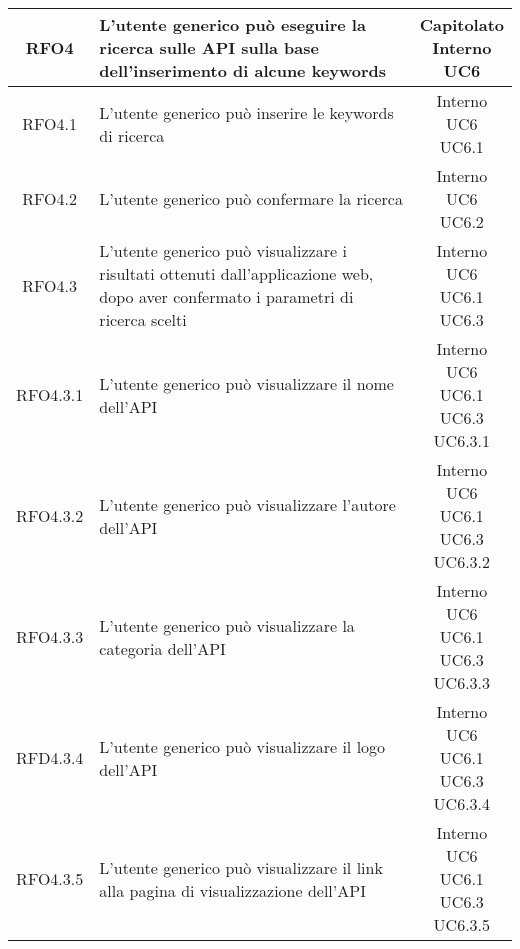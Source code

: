 \begin{longtable}{|c|p{8cm}|c|}
\hypertarget{RFO4}{RFO4} & L'utente generico può eseguire la ricerca sulle API sulla base dell'inserimento di alcune keywords & \makecell*{Capitolato\\Interno\\UC6} \\
\hline

\hypertarget{RFO4.1}{RFO4.1} & L'utente generico può inserire le keywords di ricerca & \makecell*{Interno\\UC6\\UC6.1} \\
\hline
\hypertarget{RFO4.2}{RFO4.2} & L'utente generico può confermare la ricerca  & \makecell*{Interno\\UC6\\UC6.2} \\
\hline

\hypertarget{RFO4.3}{RFO4.3} & L'utente generico può visualizzare i risultati ottenuti dall'applicazione web, dopo aver confermato i parametri di ricerca scelti & \makecell*{Interno\\UC6\\UC6.1\\UC6.3} \\
\hline
\hypertarget{RFO4.3.1}{RFO4.3.1} & L'utente generico può visualizzare il nome dell'API & \makecell*{Interno\\UC6\\UC6.1\\UC6.3\\UC6.3.1} \\
\hline
\hypertarget{RFO4.3.2}{RFO4.3.2} & L'utente generico può visualizzare l'autore dell'API & \makecell*{Interno\\UC6\\UC6.1\\UC6.3\\UC6.3.2} \\
\hline

\hypertarget{RFO4.3.3}{RFO4.3.3} & L'utente generico può visualizzare la categoria dell'API & \makecell*{Interno\\UC6\\UC6.1\\UC6.3\\UC6.3.3} \\
\hline
\hypertarget{RFD4.3.4}{RFD4.3.4} & L'utente generico può visualizzare il logo dell'API & \makecell*{Interno\\UC6\\UC6.1\\UC6.3\\UC6.3.4} \\
\hline
\hypertarget{RFO4.3.5}{RFO4.3.5} & L'utente generico può visualizzare il link alla pagina di visualizzazione dell'API & \makecell*{Interno\\UC6\\UC6.1\\UC6.3\\UC6.3.5} \\
\hline


\end{longtable}
